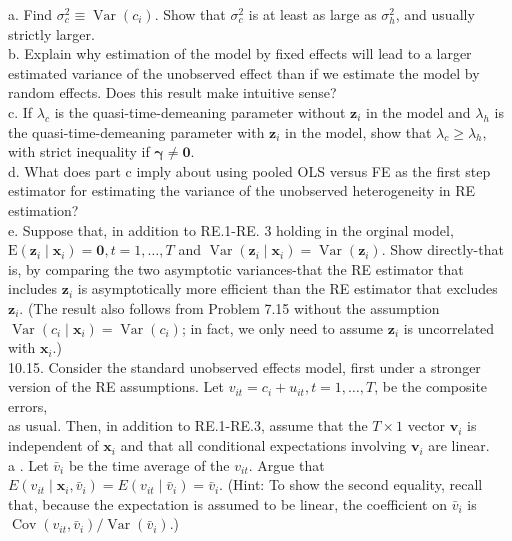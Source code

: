 \documentclass[10pt]{article}
\begin{document}
a. Find $\sigma_{c}^{2} \equiv \operatorname{Var}\left(c_{i}\right)$. Show that $\sigma_{c}^{2}$ is at least as large as $\sigma_{h}^{2}$, and usually strictly larger.\\
b. Explain why estimation of the model by fixed effects will lead to a larger estimated variance of the unobserved effect than if we estimate the model by random effects. Does this result make intuitive sense?\\
c. If $\lambda_{c}$ is the quasi-time-demeaning parameter without $\mathbf{z}_{i}$ in the model and $\lambda_{h}$ is the quasi-time-demeaning parameter with $\mathbf{z}_{i}$ in the model, show that $\lambda_{c} \geq \lambda_{h}$, with strict inequality if $\boldsymbol{\gamma} \neq \mathbf{0}$.\\
d. What does part c imply about using pooled OLS versus FE as the first step estimator for estimating the variance of the unobserved heterogeneity in RE estimation?\\
e. Suppose that, in addition to RE.1-RE. 3 holding in the orginal model, $\mathrm{E}\left(\mathbf{z}_{i} \mid \mathbf{x}_{i}\right)=\mathbf{0}, t=1, \ldots, T$ and $\operatorname{Var}\left(\mathbf{z}_{i} \mid \mathbf{x}_{i}\right)=\operatorname{Var}\left(\mathbf{z}_{i}\right)$. Show directly-that is, by comparing the two asymptotic variances-that the RE estimator that includes $\mathbf{z}_{i}$ is asymptotically more efficient than the RE estimator that excludes $\mathbf{z}_{i}$. (The result also follows from Problem 7.15 without the assumption $\operatorname{Var}\left(c_{i} \mid \mathbf{x}_{i}\right)=\operatorname{Var}\left(c_{i}\right)$; in fact, we only need to assume $\mathbf{z}_{i}$ is uncorrelated with $\mathbf{x}_{i}$.)\\
10.15. Consider the standard unobserved effects model, first under a stronger version of the RE assumptions. Let $v_{i t}=c_{i}+u_{i t}, t=1, \ldots, T$, be the composite errors,\\
as usual. Then, in addition to RE.1-RE.3, assume that the $T \times 1$ vector $\mathbf{v}_{i}$ is independent of $\mathbf{x}_{i}$ and that all conditional expectations involving $\mathbf{v}_{i}$ are linear.\\
a . Let $\bar{v}_{i}$ be the time average of the $v_{i t}$. Argue that $E\left(v_{i t} \mid \mathbf{x}_{i}, \bar{v}_{i}\right)=E\left(v_{i t} \mid \bar{v}_{i}\right)=\bar{v}_{i}$. (Hint: To show the second equality, recall that, because the expectation is assumed to be linear, the coefficient on $\bar{v}_{i}$ is $\operatorname{Cov}\left(v_{i t}, \bar{v}_{i}\right) / \operatorname{Var}\left(\bar{v}_{i}\right)$.)\\
\end{document}
